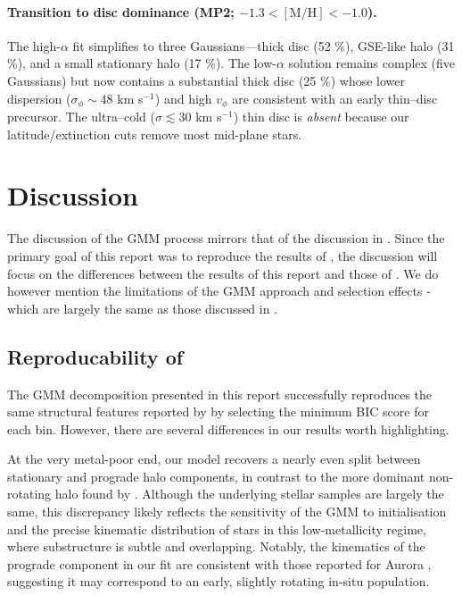 \documentclass[a4paper,12pt]{article}
\begin{document}
\paragraph{Transition to disc dominance (MP2; $-1.3<[\mathrm{M/H}]<-1.0$).}
The high-$\alpha$ fit simplifies to three Gaussians—thick disc (52 \%),
GSE-like halo (31 \%), and a small stationary halo (17 \%).
The low-$\alpha$ solution remains complex (five Gaussians) but now
contains a substantial thick disc (25 \%) whose lower dispersion
($\sigma_{\phi}\!\sim\!48$ km s$^{-1}$) and high $v_{\phi}$ are
consistent with an early thin–disc precursor.
The ultra–cold ($\sigma\!\lesssim\!30$ km s$^{-1}$) thin disc is
\emph{absent} because our latitude/extinction cuts remove most
mid-plane stars.

  






\section{Discussion} \label{sec:discussion}

The discussion of the GMM process mirrors that of the discussion in \citet{zhang2024existencemetalpoordiscmilky}.
Since the primary goal of this report was to reproduce the results of \citet{zhang2024existencemetalpoordiscmilky},
the discussion will focus on the differences between the results of this report and those of \citet{zhang2024existencemetalpoordiscmilky}.
We do however mention the limitations of the GMM approach and selection effects - which are largely 
the same as those discussed in \citet{zhang2024existencemetalpoordiscmilky}.

\subsection{Reproducability of \citet{zhang2024existencemetalpoordiscmilky}}

The GMM decomposition presented in this report successfully reproduces the same structural features reported 
by \citet{zhang2024existencemetalpoordiscmilky} by selecting the minimum BIC score for each bin. However, there 
are several differences in our results worth highlighting.

At the very metal-poor end, our model recovers a nearly even split between stationary and prograde halo 
components, in contrast to the more dominant non-rotating halo found by \citet{zhang2024existencemetalpoordiscmilky}. 
Although the underlying stellar samples are largely the same, this discrepancy likely reflects the 
sensitivity of the GMM to initialisation and the precise kinematic distribution of stars in this 
low-metallicity regime, where substructure is subtle and overlapping. Notably, the kinematics of the 
prograde component in our fit are consistent with those reported for Aurora \citep{Belokurov2022}, 
suggesting it may correspond to an early, slightly rotating in-situ population.
\end{document}

